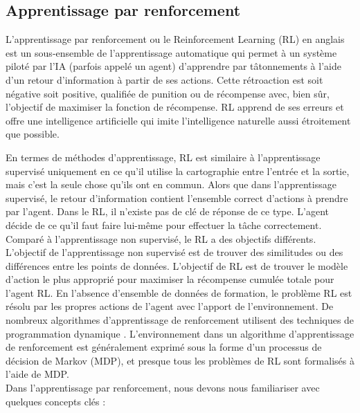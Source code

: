 \subsection{Apprentissage par renforcement}
L'apprentissage par renforcement ou le Reinforcement Learning (RL) en anglais est un sous-ensemble de l'apprentissage automatique qui permet à un système piloté par l'IA (parfois appelé un agent) d'apprendre par tâtonnements à l'aide d'un retour d'information à partir de ses actions. Cette rétroaction est soit négative soit positive, qualifiée de punition ou de récompense avec, bien sûr, l'objectif de maximiser la fonction de récompense. RL apprend de ses erreurs et offre une intelligence artificielle qui imite l'intelligence naturelle aussi étroitement que possible.

En termes de méthodes d'apprentissage, RL est similaire à l'apprentissage supervisé uniquement en ce qu'il utilise la cartographie entre l'entrée et la sortie, mais c'est la seule chose qu'ils ont en commun. Alors que dans l'apprentissage supervisé, le retour d'information contient l'ensemble correct d'actions à prendre par l'agent. Dans le RL, il n'existe pas de clé de réponse de ce type. L'agent décide de ce qu'il faut faire lui-même pour effectuer la tâche correctement. Comparé à l'apprentissage non supervisé, le RL a des objectifs différents. L'objectif de l'apprentissage non supervisé est de trouver des similitudes ou des différences entre les points de données. L'objectif de RL est de trouver le modèle d'action le plus approprié pour maximiser la récompense cumulée totale pour l'agent RL. En l'absence d'ensemble de données de formation, le problème RL est résolu par les propres actions de l'agent avec l'apport de l'environnement.
De nombreux algorithmes d'apprentissage de renforcement utilisent des techniques de programmation dynamique \cite{vanotterlo2012}.
L'environnement dans un algorithme d'apprentissage de renforcement est généralement exprimé sous la forme d'un processus de décision de Markov (MDP), et presque tous les problèmes de RL sont formalisés à l'aide de MDP.\\
Dans l'apprentissage par renforcement, nous devons nous familiariser avec quelques concepts clés :
